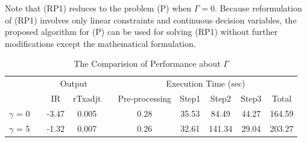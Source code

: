 \documentclass[11pt]{article}
\begin{document}
	Note that (RP1) reduces to the problem (P) when $\Gamma=0$. Because reformulation of (RP1) involves only linear constraints and continuous decision variables, the proposed algorithm for (P) can be used for solving (RP1) without further modifications except the mathematical formulation. 
	\begin{table}[]
		\centering
		\caption{The Comparision of Performance about $\Gamma$  }
		\label{gamma}
		\begin{tabular}{cccccccccc}
			&  &  &  &  &  &  &  &  &  \\ \hline
			&  & \multicolumn{2}{c}{Output} &  & \multicolumn{5}{c}{Execution Time (sec)} \\[1mm] \cline{3-4} \cline{6-10} 
			&  & IR & rTxadjt &  & Pre-processing & Step1 & Step2 & Step3 & Total \\ \cline{1-1} \cline{3-10} 
			$\gamma$ = 0 &  & -3.47 & 0.005 &  & 0.28 & 35.53 & 84.49 & 44.27 & 164.59 \\
			$\gamma$ = 5 &  & -1.32 & 0.007 &  & 0.26 & 32.61 & 141.34 & 29.04 & 203.27\\ \hline
		\end{tabular}
	\end{table}
	
	
	
	
	
	
	
\end{document}

